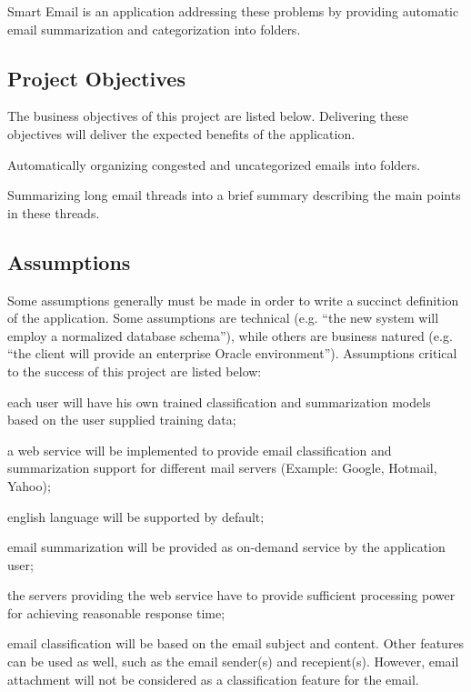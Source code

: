 \documentclass[a4paper,10pt]{article}
\newenvironment{my_itemize}
{\begin{itemize}
  \setlength{\itemsep}{0cm}
  \setlength{\parskip}{0cm}}
{\end{itemize}}
\begin{document}
Smart Email is an application addressing these problems by providing automatic 
email summarization and categorization into folders.

\subsection{Project Objectives}
The business objectives of this project are listed below. Delivering these 
objectives will deliver the expected benefits of the application.
\begin{my_itemize}
  \item Automatically organizing congested and uncategorized emails into folders.
  \item Summarizing long email threads into a brief summary describing the 
	main points in these threads.
\end{my_itemize}


\subsection{Assumptions}
Some assumptions generally must be made in order to write a succinct definition 
of the application. Some assumptions are technical (e.g. ``the new system will 
employ a normalized database schema''), while others are business natured (e.g. 
``the client will provide an enterprise Oracle environment'').  Assumptions 
critical to the success of this project are listed below:
\begin{my_itemize}
  \item each user will have his own trained classification and summarization 
	models based on the user supplied training data;
  \item a web service will be implemented to provide email 
	classification and summarization support for different mail 
	servers (Example: Google, Hotmail, Yahoo);
  \item english language will be supported by default;
  \item email summarization will be provided as on-demand service by the application user;
  \item the servers providing the web service have to provide sufficient 
	processing power for achieving reasonable response time;
  \item email classification will be based on the email subject and content. 
	Other features can be used as well, such as the email sender(s) and recepient(s). 
	However, email attachment will not be considered as a classification feature for the email.
\end{my_itemize}
\end{document}
